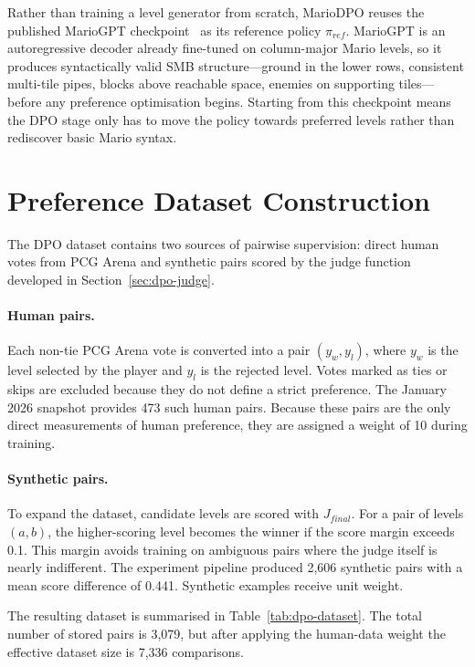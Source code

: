 \documentclass[shortabstract, mgr, english]{iithesis}
\begin{document}
Rather than training a level generator from scratch, MarioDPO reuses
the published MarioGPT checkpoint~\citep{sudhakaran2023mariogpt} as its
reference policy $\pi_{ref}$. MarioGPT is an autoregressive decoder already
fine-tuned on column-major Mario levels, so it produces syntactically valid SMB
structure---ground in the lower rows, consistent multi-tile pipes, blocks above
reachable space, enemies on supporting tiles---before any preference
optimisation begins. Starting from this checkpoint means the DPO stage only has
to move the policy towards preferred levels rather than rediscover basic Mario
syntax.

\section{Preference Dataset Construction}
\label{sec:dpo-training}
\label{subsec:dpo-dataset}

The DPO dataset contains two sources of pairwise supervision: direct
human votes from PCG Arena and synthetic pairs scored by the judge function
developed in Section~\ref{sec:dpo-judge}.

\paragraph{Human pairs.}
Each non-tie PCG Arena vote is converted into a pair $(y_w, y_l)$, where $y_w$ is
the level selected by the player and $y_l$ is the rejected level. Votes marked as
ties or skips are excluded because they do not define a strict preference. The
January 2026 snapshot provides 473 such human pairs. Because these pairs are the
only direct measurements of human preference, they are assigned a weight of
10 during training.

\paragraph{Synthetic pairs.}
To expand the dataset, candidate levels are scored with $J_{final}$. For a pair
of levels $(a,b)$, the higher-scoring level becomes the winner if the score
margin exceeds 0.1. This margin avoids training on ambiguous pairs where the
judge itself is nearly indifferent. The experiment pipeline produced 2,606
synthetic pairs with a mean score difference of 0.441. Synthetic examples receive
unit weight.

The resulting dataset is summarised in Table~\ref{tab:dpo-dataset}. The total
number of stored pairs is 3,079, but after applying the human-data weight the
effective dataset size is 7,336 comparisons.
\end{document}

